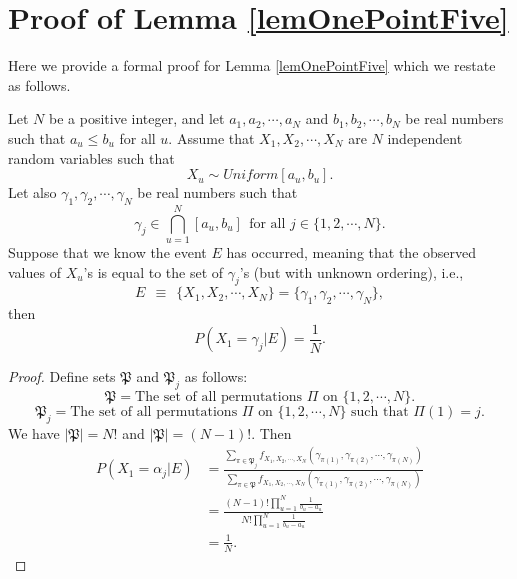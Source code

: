 \section{Proof of Lemma \ref{lemOnePointFive}}
\label{sec:app_b}
Here we provide a formal proof for Lemma \ref{lemOnePointFive} which we restate as follows.

Let $N$ be a positive integer, and let $a_1, a_2, \cdots, a_N$ and $b_1, b_2, \cdots, b_N$ be real numbers such that $a_u \leq b_u$ for all $u$. Assume that $X_1, X_2, \cdots, X_N$ are $N$ independent random variables such that
\[X_u \sim Uniform[a_u,b_u]. \]
Let also $\gamma_1, \gamma_2, \cdots, \gamma_N$ be real numbers such that
\[ \gamma_j \in \bigcap_{u=1}^{N} [a_u, b_u] \ \ \textrm{for all }j \in \{1,2,\cdots,N\}. \]
Suppose that we know the event $E$ has occurred, meaning that the observed values of $X_u$'s is equal to the set of $\gamma_j$'s (but with unknown ordering), i.e.,
\[E \ \ \equiv \ \ \{X_1,X_2,\cdots,X_N\}= \{ \gamma_1, \gamma_2, \cdots, \gamma_N \}, \] then
\[P\left(X_1=\gamma_j |E\right)=\frac{1}{N}. \]

\begin{proof}
Define sets $\mathfrak{P}$ and $\mathfrak{P}_j$ as follows:
\[\mathfrak{P}= \textrm{The set of all permutations $\Pi$ on }\{1,2,\cdots,N\}. \]
\[\mathfrak{P}_j= \textrm{The set of all permutations $\Pi$ on }\{1,2,\cdots,N\} \textrm{ such that } \Pi(1)=j. \]
We have $|\mathfrak{P}|=N!$ and $|\mathfrak{P}|=(N-1)!$. Then
\begin{align*}
 P(X_1=\alpha_j |E)&=\frac{\sum_{\pi \in \mathfrak{P}_j} f_{X_1,X_2, \cdots,X_N} (\gamma_{\pi(1)}, \gamma_{\pi(2)}, \cdots, \gamma_{\pi(N)})} {\sum_{\pi \in \mathfrak{P}} f_{X_1,X_2, \cdots,X_N} (\gamma_{\pi(1)}, \gamma_{\pi(2)}, \cdots, \gamma_{\pi(N)})}\\
 &=\frac{(N-1)! \prod\limits_{u=1}^{N} \frac{1}{b_u-a_u}}{N! \prod\limits_{u=1}^{N} \frac{1}{b_u-a_u}}\\
 &=\frac{1}{N}.
\end{align*}
\end{proof}